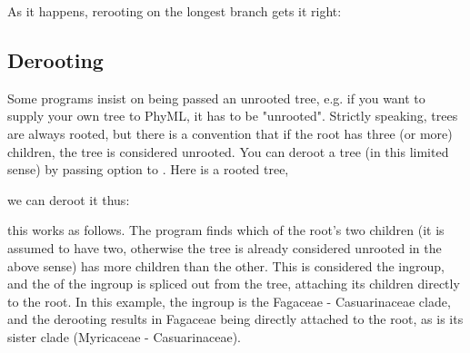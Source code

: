 As it happens, rerooting on the longest branch gets it right:



\subsection{Derooting}

Some programs insist on being passed an unrooted tree, e.g. if you want to
supply your own tree to PhyML, it has to be "unrooted". Strictly speaking,
\nw{} trees are always rooted, but there is a convention that if the root has
three (or more) children, the tree is considered unrooted. You can deroot a
tree (in this limited sense) by passing option  to \reroot{}. Here
is a rooted tree, 


we can deroot it thus:


this works as follows. The program finds which of the root's two children (it
is assumed to have two, otherwise the tree is already considered unrooted in
the above sense) has more children than the other. This is considered the
ingroup, and the \lca{} of the ingroup is spliced out from the tree, attaching
its children directly to the root. In this example, the ingroup is the Fagaceae
- Casuarinaceae clade, and the derooting results in Fagaceae being directly
attached to the root, as is its sister clade (Myricaceae - Casuarinaceae).
